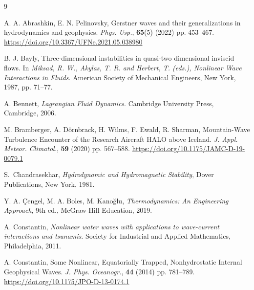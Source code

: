 \documentclass[reqno]{amsart}
\begin{document}
\begin{thebibliography}{9}


{A. A. Abrashkin, E. N. Pelinovsky}, Gerstner waves and their generalizations in hydrodynamics
and geophysics. \textit{Phys. Usp.}, {\bf 65}(5) (2022) pp.  453--467.
 \url{https://doi.org/10.3367/UFNe.2021.05.038980}

{B. J. Bayly}, Three-dimensional instabilities in quasi-two dimensional inviscid flows. In {\em Miksad,  R. W.,  Akylas, T. R. and  Herbert, T. (eds.), Nonlinear Wave Interactions in Fluids}. American Society of Mechanical Engineers, New York, 1987, pp. 71--77.



{A. Bennett}, {\em Lagrangian Fluid Dynamics}. Cambridge University Press, Cambridge, 2006.

M. Bramberger, A. Dörnbrack, H. Wilms, F. Ewald, R. Sharman, Mountain-Wave Turbulence Encounter of the Research Aircraft HALO above Iceland. \textit{J. Appl. Meteor. Climatol.}, {\bf  59} (2020) pp. 567--588.
 \url{https://doi.org/10.1175/JAMC-D-19-0079.1}










S.~Chandrasekhar,
\textit{Hydrodynamic and Hydromagnetic Stability},
Dover Publications, New York, 1981.




Y. A. Çengel, M. A. Boles, M. Kanoğlu, {\em Thermodynamics: An Engineering Approach},
9th ed., McGraw-Hill Education, 2019.

 A. Constantin,  {\em Nonlinear water waves with applications to wave-current interactions and tsunamis}. Society for
Industrial and Applied Mathematics, Philadelphia, 2011.

A. Constantin, Some Nonlinear, Equatorially Trapped, Nonhydrostatic Internal Geophysical Waves. \textit{J. Phys. Oceanogr.}, {\bf 44} (2014) pp. 781--789.
 \url{https://doi.org/10.1175/JPO-D-13-0174.1}




\end{thebibliography}
\end{document}
